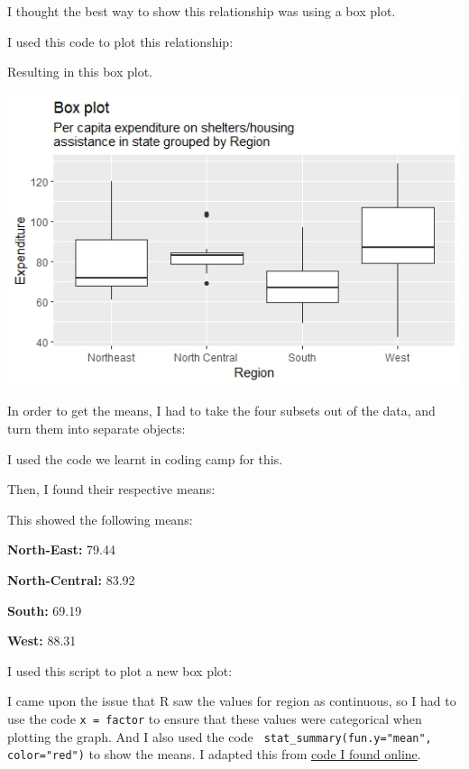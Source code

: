\documentclass[12pt,letterpaper]{article}
\begin{document}
\begin{itemize}
I thought the best way to show this relationship was using a box plot.

I used this code to plot this relationship:

\newpage

Resulting in this box plot.

\includegraphics{RegionExBox}

In order to get the means, I had to take the four subsets out of the data, and turn them into separate objects:

I used the code we learnt in coding camp for this.

Then, I found their respective means:


This showed the following means:

\textbf{North-East:} 79.44

\textbf{North-Central:} 83.92

\textbf{South:} 69.19

\textbf{West:} 88.31

\newpage
I used this script to plot a new box plot:


I came upon the issue that R saw the values for region as continuous, so I had to use the code \texttt{x = factor} to ensure that these values were categorical when plotting the graph. And I also used the code \texttt{ stat\_summary(fun.y="mean", color="red")} to show the means. I adapted this from  \href{https://www.geeksforgeeks.org/how-to-show-mean-value-in-boxplots-with-ggplot2/}{code I found online}.


\end{itemize}
\end{document}

